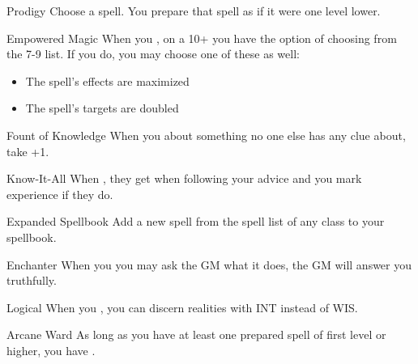 \documentclass[8pt]{extarticle}
\begin{document}

\begin{multicols}{2}
  \firstAdvances

\begin{amove}{Prodigy}
  Choose a spell. You prepare that spell as if it were one level
  lower.
\end{amove}

\begin{amove}{Empowered Magic}
  When you , on a 10+ you have the option of
  choosing from the 7-9 list. If you do, you may choose one of these
  as well:

  \begin{itemize}
  \item The spell’s effects are maximized
  \item The spell’s targets are doubled
  \end{itemize}
\end{amove}


\begin{amove}{Fount of Knowledge}
  When you  about something no one else has any clue
  about, take +1.
\end{amove}

\begin{amove}{Know-It-All}
  When , they get 
  when following your advice and you mark experience if they do.
\end{amove}

\begin{amove}{Expanded Spellbook}
  Add a new spell from the spell list of any class to your spellbook.
\end{amove}

\begin{amove}{Enchanter}
  When you  you may
  ask the GM what it does, the GM will answer you truthfully.
\end{amove}

\begin{amove}{Logical}
  When you , you can discern realities with INT instead of WIS.
\end{amove}

\begin{amove}{Arcane Ward}
  As long as you have at least one prepared spell of first level or
  higher, you have .
\end{amove}


\end{multicols}
\end{document}
